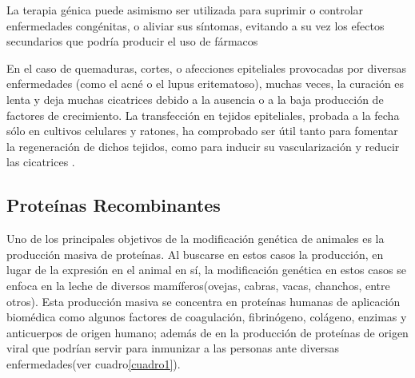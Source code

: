 \documentclass[fleqn,10pt]{SelfArx} %
\begin{document}
La terapia génica puede asimismo ser utilizada para suprimir o controlar enfermedades congénitas, o aliviar sus síntomas, evitando a su vez los efectos secundarios que podría producir el uso de fármacos \cite{Spink}

En el caso de quemaduras, cortes, o afecciones epiteliales provocadas por diversas enfermedades (como el acné o el lupus eritematoso), muchas veces, la curación es lenta y deja muchas cicatrices debido a la ausencia o a la baja producción de factores de crecimiento. La transfección en tejidos epiteliales, probada a la fecha sólo en cultivos celulares y ratones, ha comprobado ser útil tanto para fomentar la regeneración de dichos tejidos, como para inducir su vascularización y reducir las cicatrices \cite{branskigene2006, Reinhart, strulovicihuman2007}.

\subsection{Proteínas Recombinantes}

Uno de los principales objetivos de la modificación genética de animales es la producción masiva de proteínas. Al buscarse en estos casos la producción, en lugar de la expresión en el animal en sí, la modificación genética en estos casos se enfoca en la leche de diversos mamíferos(ovejas, cabras, vacas, chanchos, entre otros).  Esta producción masiva se concentra en proteínas humanas de aplicación biomédica como algunos factores de coagulación, fibrinógeno, colágeno, enzimas y anticuerpos de origen humano; además de en la producción de proteínas de origen viral que podrían servir para inmunizar a las personas ante diversas enfermedades(ver cuadro\ref{cuadro1})\cite{Durocher15012002, Koszarycz2004, niemann2007transgenic, houdebine2009production}. 
\end{document}
